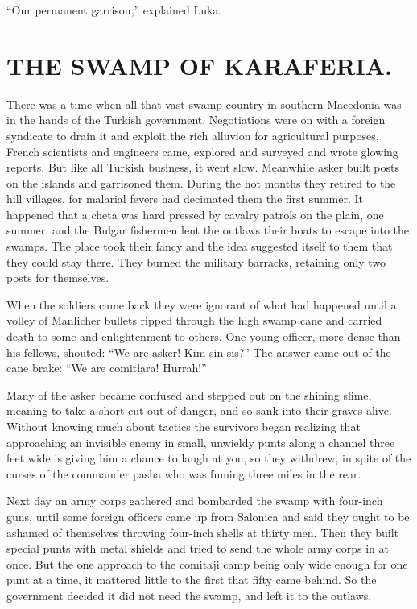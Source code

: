 \documentclass[a5paper,12pt]{book}
\begin{document}
“Our permanent garrison,” explained Luka.


\chapter{THE SWAMP OF KARAFERIA.}

There was a time when all that vast swamp country in southern Macedonia was in the hands of the Turkish government. Negotiations were on with a foreign syndicate to drain it and exploit the rich alluvion for agricultural purposes. French scientists and engineers came, explored and surveyed and wrote glowing reports. But like all Turkish business, it went slow. Meanwhile asker built posts on the islands and garrisoned them. During the hot months they retired to the hill villages, for malarial fevers had decimated them the first summer.
It happened that a cheta was hard pressed by cavalry patrols on the plain, one summer, and the Bulgar fishermen lent the outlaws their boats to escape into the swamps. The place took their fancy and the idea suggested itself to them that they could stay there. They burned the military barracks, retaining only two posts for themselves. 

When the soldiers came back they were ignorant of what had happened until a volley of Manlicher bullets ripped through the high swamp cane and carried death to some and enlightenment to others. One young officer, more dense than his fellows, shouted: “We are asker! Kim sin sis?” The answer came out of the cane brake: “We are comitlara! Hurrah!” 

Many of the asker became confused and stepped out on the shining slime, meaning to take a short cut out of danger, and so sank into their graves alive. Without knowing much about tactics the survivors began realizing that approaching an invisible enemy in small, unwieldy punts along a channel three feet wide is giving him a chance to laugh at you, so they withdrew, in spite of the curses of the commander pasha who was fuming three miles in the rear. 

Next day an army corps gathered and bombarded the swamp with four-inch guns, until some foreign officers came up from Salonica and said they ought to be ashamed of themselves throwing four-inch shells at thirty men. Then they built special punts with metal shields and tried to send the whole army corps in at once. But the one approach to the comitaji camp being only wide enough for one punt at a time, it mattered little to the first that fifty came behind. So the government decided it did not need the swamp, and left it to the outlaws. 
\end{document}
